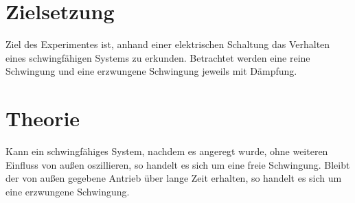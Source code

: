 \section{Zielsetzung}
Ziel des Experimentes ist, anhand einer elektrischen Schaltung das Verhalten eines schwingfähigen Systems zu erkunden. 
Betrachtet werden eine reine Schwingung und eine erzwungene Schwingung jeweils mit Dämpfung.

\section{Theorie}
\label{sec:Theorie}
Kann ein schwingfähiges System, nachdem es angeregt wurde, ohne weiteren Einfluss von außen oszillieren, so handelt es sich um eine freie Schwingung.
Bleibt der von außen gegebene Antrieb über lange Zeit erhalten, so handelt es sich um eine erzwungene Schwingung. \cite{kuchen}
